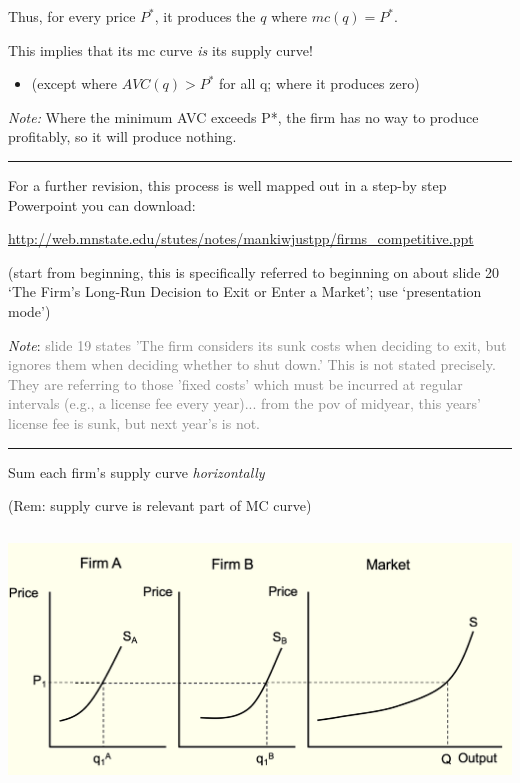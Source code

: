 \documentclass[]{article}
\providecommand{\tightlist}{%
  \setlength{\itemsep}{0pt}\setlength{\parskip}{0pt}}
\begin{document}
Thus, for every price \(P^{*}\), it produces the \(q\) where \(mc(q)=P^{*}\).

\bigskip

This implies that its mc curve \emph{is} its supply curve!\\

\begin{itemize}
\tightlist
\item
  (except where \(AVC(q)>P^*\) for all q; where it produces zero)
\end{itemize}

\emph{Note:}
Where the minimum AVC exceeds P*, the firm has no way to produce profitably, so it will produce nothing.

\begin{center}\rule{0.5\linewidth}{\linethickness}\end{center}

For a further revision, this process is well mapped out in a step-by step Powerpoint you can download:

\url{http://web.mnstate.edu/stutes/notes/mankiwjustpp/firms_competitive.ppt}

(start from beginning, this is specifically referred to beginning on about slide 20 `The Firm's Long-Run Decision to Exit or Enter a Market'; use `presentation mode')

\emph{Note}: \textcolor{gray}{slide 19 states 'The firm considers its sunk costs when deciding to exit, but ignores them when deciding whether to shut down.' This is not stated precisely. They are referring to those 'fixed costs' which must be incurred at regular intervals (e.g., a license fee every year)... from the pov of midyear, this years' license fee is sunk, but next year's is not.}

\begin{center}\rule{0.5\linewidth}{\linethickness}\end{center}

Sum each firm's supply curve \emph{horizontally}

\bigskip

(Rem: supply curve is relevant part of MC curve)

\includegraphics[height=2.7in]{picsfigs/srsupply.png}
\end{document}
